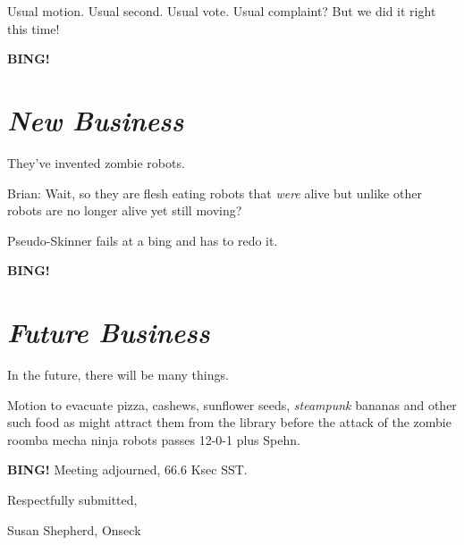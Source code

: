 \documentclass[10pt]{article}
\newcommand{\bing}{{\bf BING!} }
\newcommand{\goto}[1]{\bing \vskip 12pt \section*{{\em{#1}}}}
\newcommand{\ps}{ plus Spehn\xspace}
\begin{document}
Usual motion. Usual second. Usual vote. Usual complaint? But we did it right this time!

\goto{New Business}

They've invented zombie robots.

Brian: Wait, so they are flesh eating robots that \emph{were} alive but unlike other robots are no longer alive yet still moving?

Pseudo-Skinner fails at a bing and has to redo it.

\goto{Future Business}

In the future, there will be many things.

Motion to evacuate pizza, cashews, sunflower seeds, \emph{steampunk} bananas and other such food as might attract them from the library before the attack of the zombie roomba mecha ninja robots passes 12-0-1\ps.

\bing
\noindent
Meeting adjourned, 66.6 Ksec SST.

\vspace{18pt}

\centerline{Respectfully submitted,}
\centerline{Susan Shepherd, Onseck}
\end{document}

